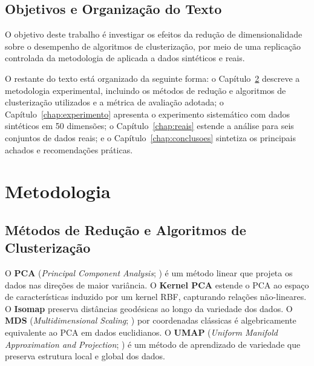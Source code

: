 \documentclass[12pt,a4paper]{report}
\begin{document}
\section{Objetivos e Organização do Texto}

O objetivo deste trabalho é investigar os efeitos da redução de
dimensionalidade sobre o desempenho de algoritmos de clusterização, por
meio de uma replicação controlada da metodologia de \citet{amate2026}
aplicada a dados sintéticos e reais.

O restante do texto está organizado da seguinte forma: o
Capítulo~\ref{chap:metodologia} descreve a metodologia experimental,
incluindo os métodos de redução e algoritmos de clusterização utilizados
e a métrica de avaliação adotada; o Capítulo~\ref{chap:experimento}
apresenta o experimento sistemático com dados sintéticos em 50 dimensões;
o Capítulo~\ref{chap:reais} estende a análise para seis conjuntos de dados
reais; e o Capítulo~\ref{chap:conclusoes} sintetiza os principais achados
e recomendações práticas.

\chapter{Metodologia}
\label{chap:metodologia}

\section{Métodos de Redução e Algoritmos de Clusterização}

O \textbf{PCA} (\textit{Principal Component Analysis}; \citealt{pearson1901})
é um método linear que projeta os dados nas direções de maior variância. O
\textbf{Kernel PCA} \citep{scholkopf1998} estende o PCA ao espaço de
características induzido por um kernel RBF, capturando relações não-lineares. O
\textbf{Isomap} \citep{tenenbaum2000} preserva distâncias geodésicas ao longo
da variedade dos dados. O \textbf{MDS} (\textit{Multidimensional Scaling};
\citealt{torgerson1952}) por coordenadas clássicas é algebricamente equivalente
ao PCA em dados euclidianos. O \textbf{UMAP} (\textit{Uniform Manifold
Approximation and Projection}; \citealt{mcinnes2018}) é um método de
aprendizado de variedade que preserva estrutura local e global dos dados.
\end{document}
